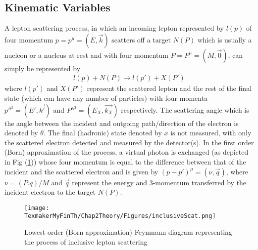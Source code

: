 \subsection{Kinematic Variables}
A lepton scattering process, in which an incoming lepton represented by $l(p)$ of four momentum $p=p^{\mu}=(E,\vec{k})$ scatters off a target $N(P)$ which is usually a nucleon or a nucleus at rest and with four momentum $P=P^{\mu}=(M,\vec{0})$, can simply be represented by
\begin{eqnarray}
\label{lepScat}
l(p) + N(P) \rightarrow l(p') + X(P')
\end{eqnarray}
where $l(p')$ and $X(P')$ represent the scattered lepton and the rest of the final state (which can have any number of particles) with four momenta $p'^{\mu}=(E',\vec{k'})$ and $P'^{\mu}=(E_X,\vec{k_X})$ respectively. The scattering angle which is the angle between the incident and outgoing path/direction of the electron is denoted by $\theta$. The final (hadronic) state denoted by $x$ is %
not measured, with only the scattered electron detected and measured by the detector(s). In the first order (Born) approximation of the process, a virtual photon is exchanged (as depicted in Fig (\ref{figInclSc})) whose four momentum is equal to the difference between that of the incident and the scattered electron and is given by $(p-p')^{\mu}=(\nu,\vec{q})$, where $\nu = (P.q)/M $ and $\vec{q}$ represent the energy and 3-momentum transferred by the incident electron to the target $N(P)$.

\begin{figure}[h]%
\centering
	\leavevmode \texttt{[image: TexmakerMyFinTh/Chap2Theory/Figures/inclusiveScat.png]}
	\caption[Inclusive scattering (Born Approximation)]{Lowest order (Born approximation) Feynmann diagram representing the process of inclusive lepton scattering}
	\label{figInclSc}
\end{figure}

